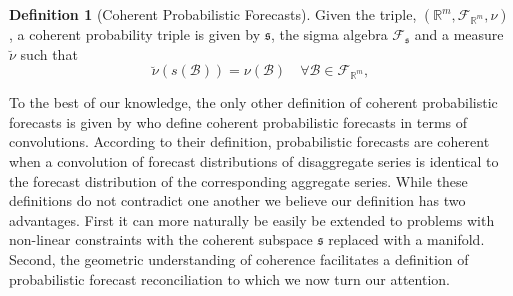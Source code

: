 \documentclass[12pt]{article}
\theoremstyle{definition}
\newtheorem{definition}{Definition}[section]
\begin{document}
\begin{definition}[Coherent Probabilistic Forecasts]\label{def:cohprob}
	Given the triple, $(\mathbb{R}^m, \mathscr{F}_{\mathbb{R}^m}, \nu)$, a coherent probability triple is given by $\mathfrak{s}$, the sigma algebra $\mathscr{F}_{\mathfrak{s}}$ and a measure $\breve{\nu}$ such that
	\[
	\breve{\nu}(s(\mathcal{B})) = \nu(\mathcal{B}) \quad \forall \mathcal{B} \in \mathscr{F}_{\mathbb{R}^m},
	\]
\end{definition}

To the best of our knowledge, the only other definition of coherent probabilistic forecasts is given by \citet{BenTaieb2017} who define coherent probabilistic forecasts in terms of convolutions. According to their definition, probabilistic forecasts are coherent when a convolution of forecast distributions of disaggregate series is identical to the forecast distribution of the corresponding aggregate series. While these definitions do not contradict one another we believe our definition has two advantages.  First it can more naturally be easily be extended to problems with non-linear constraints with the coherent subspace $\mathfrak{s}$ replaced with a manifold.  Second, the geometric understanding of coherence facilitates a definition of probabilistic forecast reconciliation to which we now turn our attention.

%
%	
%
\end{document}
